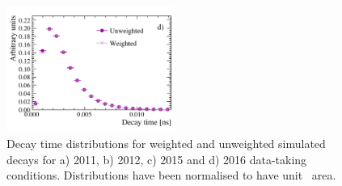 \begin{figure}[tbp]
    \includegraphics[width=0.49\textwidth]{./Figs/LifetimeMeasurement/2016_DT_Bs2MuMu.pdf}
  \caption{Decay time distributions for weighted and unweighted \bsmumu simulated decays for a) 2011, b) 2012, c) 2015 and d) 2016 data-taking conditions. Distributions have been normalised to have unit \
area.}
  \label{fig:BsmmDT}
\end{figure}



